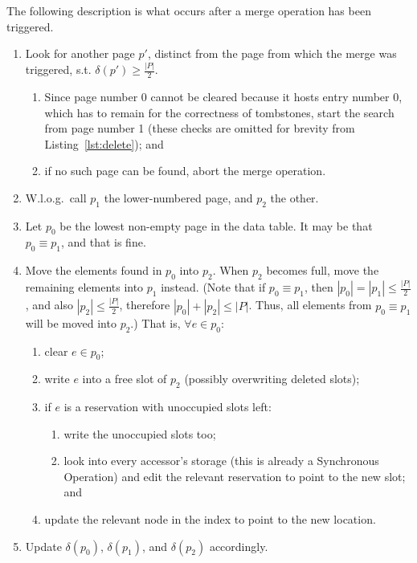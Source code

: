 The following description is what occurs after a merge operation has been triggered.
\begin{enumerate}
    \item Look for another page $p'$, distinct from the page from which the merge was triggered, s.t. $\delta(p') \geq \frac{|P|}{2}$.
    \begin{enumerate}
        \item Since page number 0 cannot be cleared because it hosts entry number 0, which has to remain for the correctness of tombstones, start the search from page number 1 (these checks are omitted for brevity from Listing~\ref{lst:delete}); and
        \item if no such page can be found, abort the merge operation.
    \end{enumerate}
    \item W.l.o.g.\ call $p_1$ the lower-numbered page, and $p_2$ the other.
    \item Let $p_0$ be the lowest non-empty page in the data table.
    It may be that $p_0 \equiv p_1$, and that is fine.
    \item Move the elements found in $p_0$ into $p_2$.
    When $p_2$ becomes full, move the remaining elements into $p_1$ instead.
    (Note that if $p_0 \equiv p_1$, then $|p_0| = |p_1| \leq \frac{|P|}{2}$, and also $|p_2| \leq \frac{|P|}{2}$, therefore $|p_0| + |p_2| \leq |P|$.
    Thus, all elements from $p_0 \equiv p_1$ will be moved into $p_2$.)
    That is, $\forall e \in p_0$:
    \begin{enumerate}
        \item clear $e \in p_0$;
        \item write $e$ into a free slot of $p_2$ (possibly overwriting deleted slots);
        \item if $e$ is a reservation with unoccupied slots left:
        \begin{enumerate}
            \item write the unoccupied slots too;
            \item look into every accessor's storage (this is already a Synchronous Operation) and edit the relevant reservation to point to the new slot; and
        \end{enumerate}
        \item update the relevant node in the index to point to the new location.
    \end{enumerate}
    \item Update $\delta(p_0)$, $\delta(p_1)$, and $\delta(p_2)$ accordingly.
\end{enumerate}

